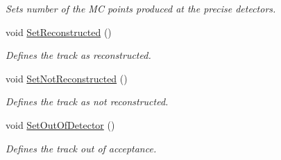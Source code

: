 \begin{DoxyCompactItemize}
\begin{DoxyCompactList}\small\item\em Sets number of the MC points produced at the precise detectors. \end{DoxyCompactList}\item 
void \hyperlink{classKFMCTrack_aa27185332c1ad2a7093130499f3776ee}{Set\+Reconstructed} ()\hypertarget{classKFMCTrack_aa27185332c1ad2a7093130499f3776ee}{}\label{classKFMCTrack_aa27185332c1ad2a7093130499f3776ee}

\begin{DoxyCompactList}\small\item\em Defines the track as reconstructed. \end{DoxyCompactList}\item 
void \hyperlink{classKFMCTrack_a2b5f295bc2b44990ff1f924183bee9ee}{Set\+Not\+Reconstructed} ()\hypertarget{classKFMCTrack_a2b5f295bc2b44990ff1f924183bee9ee}{}\label{classKFMCTrack_a2b5f295bc2b44990ff1f924183bee9ee}

\begin{DoxyCompactList}\small\item\em Defines the track as not reconstructed. \end{DoxyCompactList}\item 
void \hyperlink{classKFMCTrack_a2b91b7ed5a5250890d5a92a6e7cf31b7}{Set\+Out\+Of\+Detector} ()\hypertarget{classKFMCTrack_a2b91b7ed5a5250890d5a92a6e7cf31b7}{}\label{classKFMCTrack_a2b91b7ed5a5250890d5a92a6e7cf31b7}

\begin{DoxyCompactList}\small\item\em Defines the track out of acceptance. \end{DoxyCompactList}\end{DoxyCompactItemize}

